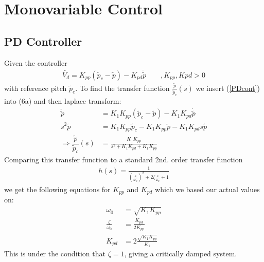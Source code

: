\section{Monovariable Control}


\subsection{PD Controller}
Given the controller
\begin{align}
    \tilde{V_d} = K_{pp}(\widetilde{p}_c-\widetilde{p}) - K_{pd}\dot{\tilde{p}} 
    \quad\quad, K_{pp},K{pd} >0  \label{PDcont}
\end{align}
with reference pitch $\widetilde{p}_c$. To find the transfer function $\frac{\tilde{p}}{\tilde{p}_c}(s)$ we insert (\ref{PDcont}) into (6a) and then laplace transform:
%
\begin{align}
    \ddot{\tilde{p}} &= K_1K_{pp}(\tilde{p}_c-\tilde{p}) - K_1K_{pd}\dot{\tilde{p}}\nonumber\\
    s^2\tilde{p} &= K_1K_{pp}\tilde{p}_c - K_1K_{pp}\tilde{p} - K_1K_{pd}s\tilde{p}\nonumber\\
    \Rightarrow \dfrac{\tilde{p}}{\tilde{p}_c}(s) &= \frac{K_1K_{pp}}{s^2+K_1K_{pd}+K_1K_{pp}}  \label{transf}
\end{align}
%
Comparing this transfer function to a standard 2nd. order transfer function
%
\begin{align*}
    h(s) = \frac{1}{(\frac{s}{\omega_0})^2 + 2\zeta\frac{s}{\omega_0} + 1}
\end{align*}
%
we get the following equations for $K_{pp}$ and $K_{pd}$ which we based our actual values on:
%
\begin{align}
    \omega_0 &= \sqrt{K_1K_{pp}}                     \nonumber\\
    \frac{\zeta}{\omega_0} &= \frac{K_{pd}}{2K_{pp}} \nonumber\\
    K_{pd} &= 2\frac{\sqrt{K_1K_{pp}}}{K_1}          \label{Kpd}
\end{align}
%
This is under the condition that $\zeta = 1$, giving a critically damped system.



